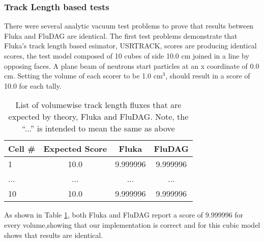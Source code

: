 \documentclass{anstrans}
\begin{document}
\subsubsection*{Track Length based tests}
There were several analytic vacuum test problems to prove that results
between Fluka and FluDAG are identical. The first test problems
demonstrate that Fluka's track length based esimator, USRTRACK, 
scores are producing identical scores, the test model composed of 
10 cubes of side 10.0 cm joined in a line by opposing faces. A plane 
beam of neutrons start particles at an x coordinate of 0.0 cm. Setting 
the volume of each scorer to be 1.0 cm$^3$, should result in a score of 
10.0 for each tally.
\begin{table}[h!]
	\begin{center}
		\begin{tabular}{|l|c|c|c|}
			\hline
			Cell \# & Expected Score & Fluka  & FluDAG \\
			\hline
			1 & 10.0 & 9.999996 & 9.999996 \\
			... & ... & ... & ... \\
			10 & 10.0 & 9.999996 & 9.999996 \\
			\hline
		\end{tabular}
	\caption{List of volumewise track length fluxes that are 
				expected by theory, Fluka and FluDAG. Note, the ``...''
				is intended to mean the same as above}
	\end{center}
	\label{usrtrack}
\end{table}

As shown in Table \ref{usrtrack}, both Fluka and FluDAG report a score of 
9.999996 for every volume,showing that our implementation is correct and for 
this cubic model shows that results are identical.
\end{document}
